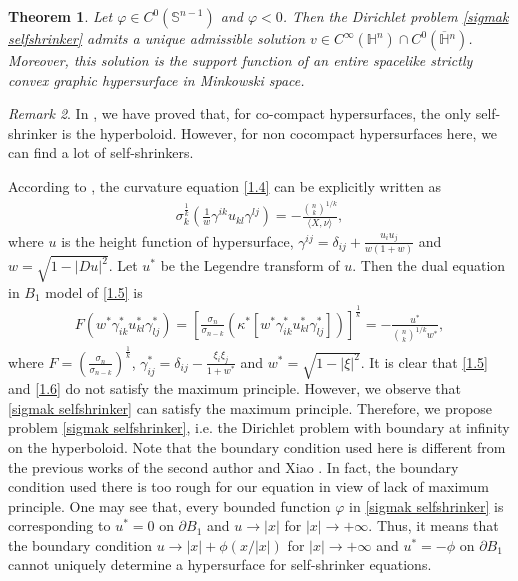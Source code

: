 \documentclass[reqno]{amsart}
\newtheorem{theorem}{Theorem}[section]
\theoremstyle{remark}
\newtheorem{remark}[theorem]{Remark}
\theoremstyle{definition}
\numberwithin{equation}{section}
\begin{document}
\begin{theorem}\label{self-shrinker existence}
    Let $\varphi \in C^0(\mathbb{S}^{n-1})$ and $\varphi<0$. Then the Dirichlet problem \eqref{sigmak selfshrinker} admits a unique admissible solution $v \in C^\infty(\mathbb{H}^n) \cap C^0(\overline{\mathbb{H}}{}^n)$. Moreover, this solution is the support function of an entire spacelike strictly convex graphic hypersurface in Minkowski space.
\end{theorem}

\begin{remark}
In \cite{InverseHessianCurvatureFlow},  we have proved that, for co-compact hypersurfaces, the only self-shrinker is the hyperboloid. However, for non cocompact hypersurfaces here, we can find a lot of self-shrinkers.   
\end{remark}

According to \cite{Entireconstantsigmak}, the curvature equation \eqref{1.4} can be explicitly written as 
\begin{align}\label{1.5}
    \sigma_k^\frac{1}{k}\left( \frac{1}{w} \gamma^{ik} u_{kl} \gamma^{lj} \right) = - \frac{\binom{n}{k}^{1/k}}{\langle X, \nu \rangle},
\end{align}
where $u$ is the height function of hypersurface, $\gamma^{ij} = \delta_{ij} + \frac{u_i u_j}{w(1+w)}$ and $w = \sqrt{1 - |Du|^2}$. Let $u^*$ be the Legendre transform of $u$. Then the dual equation in $B_1$ model of \eqref{1.5} is
\begin{align}\label{1.6}
    F(w^* \gamma_{ik}^* u_{kl}^* \gamma_{lj}^*) = \left[ \frac{\sigma_n}{\sigma_{n-k}} (\kappa^* [w^* \gamma_{ik}^* u_{kl}^* \gamma_{lj}^*]) \right]^{\frac{1}{k}} = - \frac{u^*}{\binom{n}{k}^{1/k} w^*}, 
\end{align}
where $F=\left( \frac{\sigma_n}{\sigma_{n-k}} \right)^{\frac{1}{k}}$, $\gamma_{ij}^* = \delta_{ij} - \frac{\xi_i \xi_j}{1 + w^*}$ and $w^* = \sqrt{1 - |\xi|^2}$.  It is clear that \eqref{1.5} and \eqref{1.6}  do not satisfy the maximum principle. However, we observe that \eqref{sigmak selfshrinker} can satisfy the maximum principle. Therefore,  we propose problem \eqref{sigmak selfshrinker}, i.e. the Dirichlet problem with boundary at infinity on the hyperboloid. Note that the boundary condition used here is different from the previous works of the second author and Xiao \cite{Entireconstantsigmak,WX21,Entireself-expanders}. In fact, the boundary condition used there is  too rough for our equation in view of lack of maximum principle.  One may see that, every bounded function $\varphi$ in \eqref{sigmak selfshrinker} is corresponding to $u^*=0$ on $\partial B_1$ and $u\rightarrow |x|$ for $|x|\rightarrow +\infty$. Thus, it means that the boundary condition $u\rightarrow |x|+\phi(x/|x|)$ for $|x|\rightarrow+\infty$ and $u^*=-\phi$ on $\partial B_1$ cannot uniquely determine a hypersurface for self-shrinker equations.       
\end{document}
